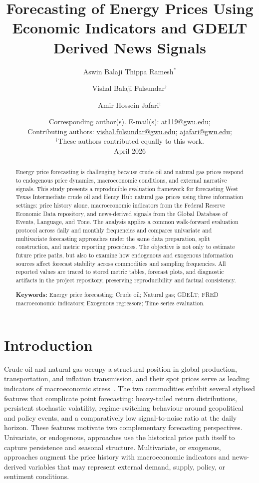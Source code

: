 \documentclass[11pt,a4paper]{article}
\title{Forecasting of Energy Prices Using Economic Indicators and GDELT Derived News Signals}
\author[1]{Aswin Balaji Thippa Ramesh$^{\ast}$}
\author[1]{Vishal Balaji Fulsundar$^{\dagger}$}
\author[1]{Amir Hossein Jafari$^{\ddagger}$}
\affil[1]{Data Science Program, The George Washington University, Washington, DC, USA}
\date{\small
Corresponding author(s). E-mail(s): \href{mailto:at119@gwu.edu}{at119@gwu.edu};\\
Contributing authors: \href{mailto:vishal.fulsundar@gwu.edu}{vishal.fulsundar@gwu.edu}; \href{mailto:ajafari@gwu.edu}{ajafari@gwu.edu};\\
$^\dagger$These authors contributed equally to this work.\\[0.5em]
April 2026}
\begin{document}
\maketitle

\begin{abstract}
Energy price forecasting is challenging because crude oil and natural gas prices respond to endogenous price dynamics, macroeconomic conditions, and external narrative signals. This study presents a reproducible evaluation framework for forecasting West Texas Intermediate crude oil and Henry Hub natural gas prices using three information settings: price history alone, macroeconomic indicators from the Federal Reserve Economic Data repository, and news-derived signals from the Global Database of Events, Language, and Tone. The analysis applies a common walk-forward evaluation protocol across daily and monthly frequencies and compares univariate and multivariate forecasting approaches under the same data preparation, split construction, and metric reporting procedures. The objective is not only to estimate future price paths, but also to examine how endogenous and exogenous information sources affect forecast stability across commodities and sampling frequencies. All reported values are traced to stored metric tables, forecast plots, and diagnostic artifacts in the project repository, preserving reproducibility and factual consistency.

\medskip
\noindent\textbf{Keywords:} Energy price forecasting; Crude oil; Natural gas; GDELT; FRED macroeconomic indicators; Exogenous regressors; Time series evaluation.
\end{abstract}

\section{Introduction}\label{sec:intro}

Crude oil and natural gas occupy a structural position in global production, transportation, and inflation transmission, and their spot prices serve as leading indicators of macroeconomic stress~\citep{kilian2009not, hamilton2009causes, baumeister2016forty}. The two commodities exhibit several stylised features that complicate point forecasting: heavy-tailed return distributions, persistent stochastic volatility, regime-switching behaviour around geopolitical and policy events, and a comparatively low signal-to-noise ratio at the daily horizon. These features motivate two complementary forecasting perspectives. Univariate, or endogenous, approaches use the historical price path itself to capture persistence and seasonal structure. Multivariate, or exogenous, approaches augment the price history with macroeconomic indicators and news-derived variables that may represent external demand, supply, policy, or sentiment conditions.
\end{document}
